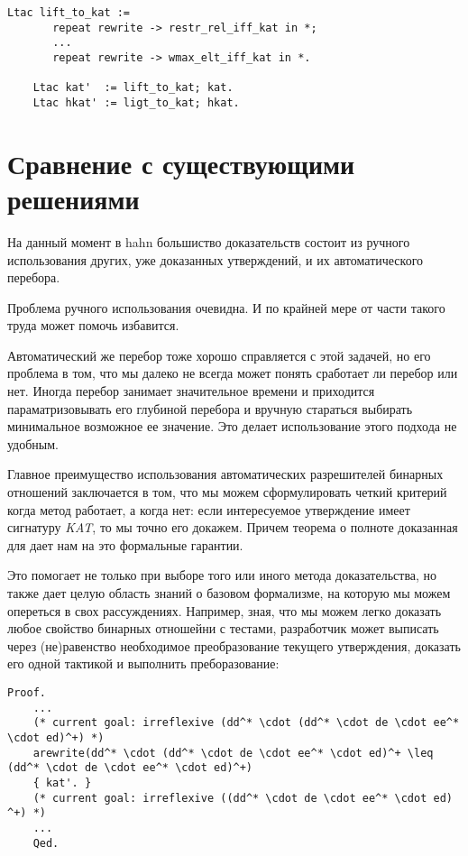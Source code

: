 \documentclass[times
              ]{itmo-student-thesis}
\begin{document}
    \begin{lstlisting}[float=!h, gobble=4,
      caption={Объявление тактик, которые позволят автоматически доказывать утверждения в старых
        определениях}, label={lst:define_lift}]
    Ltac lift_to_kat :=
       repeat rewrite -> restr_rel_iff_kat in *;
       ...
       repeat rewrite -> wmax_elt_iff_kat in *.

    Ltac kat'  := lift_to_kat; kat.
    Ltac hkat' := ligt_to_kat; hkat.
    \end{lstlisting}

  \newpage %
  \section{Сравнение с существующими решениями}

    На данный момент в hahn большиство доказательств состоит из ручного использования других, уже
    доказанных утверждений, и их автоматического перебора.

    Проблема ручного использования очевидна. И по крайней мере от части такого труда 
    может помочь избавится.

    Автоматический же перебор тоже хорошо справляется с этой задачей, но его проблема в том, что мы
    далеко не всегда может понять сработает ли перебор или нет. Иногда перебор занимает значительное
    времени и приходится параматризовывать его глубиной перебора и вручную стараться выбирать
    минимальное возможное ее значение. Это делает использование этого подхода не удобным.

    Главное преимущество использования автоматических разрешителей бинарных отношений заключается в
    том, что мы можем сформулировать четкий критерий когда метод работает, а когда нет: если
    интересуемое утверждение имеет сигнатуру \textit{KAT}, то мы точно его докажем. Причем теорема о
    полноте доказанная для  дает нам на это формальные гарантии.

    Это помогает не только при выборе того или иного метода доказательства, но также дает целую область
    знаний о базовом формализме, на которую мы можем опереться в свох рассуждениях. Например, зная, что
    мы можем легко доказать любое свойство бинарных отношейни с тестами, разработчик может выписать через
    (не)равенство необходимое преобразование текущего утверждения, доказать его одной тактикой
     и выполнить преборазование:

    \begin{lstlisting}[float=false, gobble=4,
      caption={Пример доказательства вспомогательного утверждения, необходимого для преобразования, с
        помощью \textit{KAT}}, label={lst:arewrite}]
    Proof.
    ...
    (* current goal: irreflexive (dd^* \cdot (dd^* \cdot de \cdot ee^* \cdot ed)^+) *)
    arewrite(dd^* \cdot (dd^* \cdot de \cdot ee^* \cdot ed)^+ \leq (dd^* \cdot de \cdot ee^* \cdot ed)^+)
    { kat'. }
    (* current goal: irreflexive ((dd^* \cdot de \cdot ee^* \cdot ed) ^+) *)
    ...
    Qed.
    \end{lstlisting}
\end{document}
